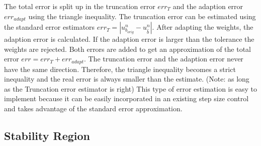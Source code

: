 \documentclass[a4paper]{article}
\numberwithin{equation}{section}
\theoremstyle{plain}
\theoremstyle{definition}
\numberwithin{theorem}{section}
\newcommand{\1}{\mathbbm{1}}
\begin{document}
The total error is split up in the truncation error $err_T$ and the adaption error $err_{adapt}$ using the triangle inequality. 
The truncation error can be estimated using the standard error estimators $err_T = | u^{n}_{b_{orig}} - u^{n}_{\hat{b}} |$. 
After adapting the weights, the adaption error is calculated. If the adaption error is larger than the tolerance the weights are rejected.  
Both errors are added to get an approximation of the total error $err = err_T + err_{adapt}$.
The truncation error and the adaption error never have the same direction.  
Therefore, the triangle inequality becomes a strict inequality and the real error is always smaller than the estimate. (Note: as long as the Truncation error estimator is right) 
This type of error estimation is easy to implement because it can be easily incorporated in an existing step size control and takes advantage of the standard error approximation.


\subsection{Stability Region}
\end{document}

